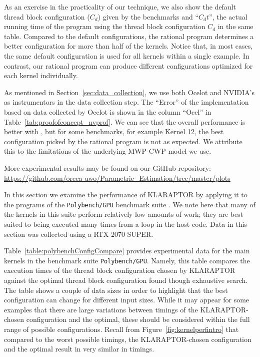 As an exercise in the practicality of our technique,
 we also show the default thread block configuration ($C_d$) 
 given by the benchmarks  and ``$C_dt$'', the actual running time of the program
using the thread block configuration $C_d$ in the same table. 
Compared to the default configurations, the rational program determines a better configuration
for more than half of the kernels.
Notice that, in most cases, the same default configuration is used 
for all kernels within a single example.
In contrast, our rational program can produce different configurations optimized
for each kernel individually.

As mentioned in Section~\ref{sec:data_collection}, we use
both Ocelot \cite{DBLP:conf/IEEEpact/DiamosKYC10} and
NVIDIA's {\nvprof}\cite{nvprofguide} as instrumentors in the data collection step.
The ``Error''  of the implementation based on data collected by Ocelot is shown in the column ``Ocel'' in Table~\ref{tab:proofofconcept_nvprof}.
We can see that the overall performance is better with \nvprof,
but for some benchmarks, for example Kernel 12,
the best configuration picked by the rational program 
is not as expected. We attribute this to the limitations of the
underlying MWP-CWP model we use.

More experimental results may be found on our GitHub repository:
{
\small
\color{navy}
\url{https://github.com/orcca-uwo/Parametric_Estimation/tree/master/plots}
}
\fi

In this section we examine the performance of KLARAPTOR 
by applying it to the {\cuda} programs of the 
\texttt{Polybench/GPU} benchmark suite \cite{grauer2012auto}.
We note here that many of the kernels in this
suite perform relatively low amounts of work;
they are best suited to being executed many times
from a loop in the host code.
Data in this section was collected using a RTX 2070 SUPER. 



Table~\ref{table:polybenchConfigCompare} 
provides experimental data for the main kernels in the 
benchmark suite \texttt{Polybench/GPU}. Namely, this table compares 
the execution times of the thread block configuration chosen by KLARAPTOR against
the optimal thread block configuration found though exhaustive search. 
The table shows a couple of data sizes in order to highlight that the best configuration 
can change for different input sizes.
While it may appear for some examples that there are large variations 
between timings of the KLARAPTOR-chosen configuration and the optimal, 
these should be considered within the full range of possible configurations.
Recall from Figure~\ref{fig:kernelperfintro} that compared to
the worst possible timings, the KLARAPTOR-chosen configuration 
and the optimal result in very similar in timings.

